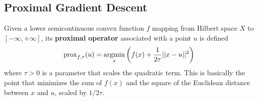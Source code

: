 \subsection{Proximal Gradient Descent}

  \begin{definition}
    Given a lower semicontinuous convex function $f$ mapping from Hilbert space $X$ to $[-\infty, +\infty]$, its \textbf{proximal operator} associated with a point $u$ is defined 
    \begin{equation}
      \prox_{f, \tau} (u) = \argmin_{x} \bigg( f(x) + \frac{1}{2\tau} ||x - u||^2 \bigg)
    \end{equation}
    where $\tau > 0$ is a parameter that scales the quadratic term. This is basically the point that minimizes the sum of $f(x)$ and the square of the Euclidean distance between $x$ and $u$, scaled by $1/2\tau$. 
  \end{definition}

